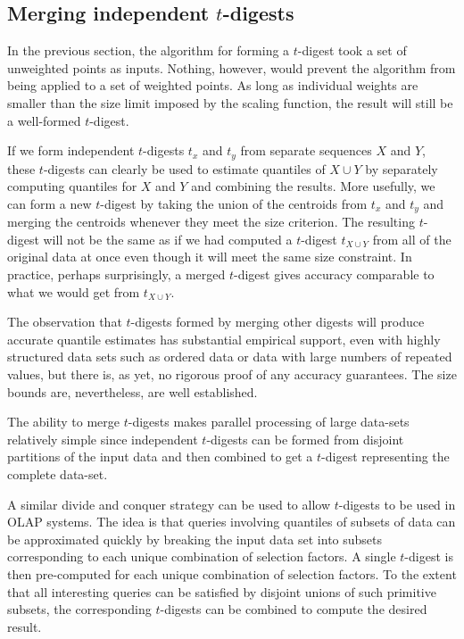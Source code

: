 \documentclass[11pt]{amsart}
\begin{document}
\subsection{Merging independent $t$-digests}
In the previous section, the algorithm for forming a $t$-digest took a set of unweighted points as inputs. Nothing, however, would prevent the algorithm from being applied to a set of weighted points. As long as individual weights are smaller than the size limit imposed by the scaling function, the result will still be a well-formed $t$-digest.

If we form independent $t$-digests $t_x$ and $t_y$ from separate sequences $X$ and $Y$, these $t$-digests can clearly be used to estimate quantiles of $X \cup Y$ by separately computing quantiles for $X$ and $Y$ and combining the results. More usefully, we can form a new $t$-digest by taking the union of the centroids from $t_x$ and $t_y$ and merging the centroids whenever they meet the size criterion. The resulting $t$-digest will not be the same as if we had computed a $t$-digest $t_{X \cup Y}$ from all of the original data at once even though it will meet the same size constraint. In practice, perhaps surprisingly, a merged $t$-digest gives accuracy comparable to what we would get from $t_{X\cup Y}$.

The observation that $t$-digests formed by merging other digests will produce accurate quantile estimates has substantial empirical support, even with highly structured data sets such as ordered data or data with large numbers of repeated values, but there is, as yet, no rigorous proof of any accuracy guarantees. The size bounds are, nevertheless, are well established.

The ability to merge $t$-digests makes parallel processing of large data-sets relatively simple since independent $t$-digests can be formed from disjoint partitions of the input data and then combined to get a $t$-digest representing the complete data-set.

A similar divide and conquer strategy can be used to allow $t$-digests to be used in OLAP systems. The idea is that queries involving quantiles of subsets of data can be approximated quickly by breaking the input data set into subsets corresponding to each unique combination of selection factors. A single $t$-digest is then pre-computed for each unique combination of selection factors. To the extent that all interesting queries can be satisfied by disjoint unions of such primitive subsets, the corresponding $t$-digests can be combined to compute the desired result.
\end{document}
